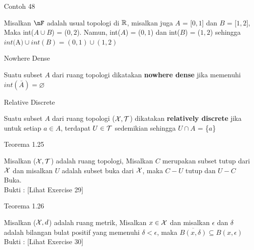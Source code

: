 \begin{frame}{Contoh 48}
    \begin{tcolorbox}[enhanced,title= Contoh 48, frame style tile={width=\paperwidth}{\wallpaper}]
        Misalkan $\nF$ adalah usual topologi di $\mathbb{R}$, misalkan juga $A$ = [$0, 1$] dan $B$ = [$1, 2$], Maka int($A \cup B$) = ($0,2$). Namun, int($A$) = ($0,1$) dan int($B$) = ($1,2$) sehingga $int($A$) \cup int(B) = (0,1) \cup (1,2)$

        
    \end{tcolorbox}
\end{frame}

\begin{frame}{Nowhere Dense}
    \begin{tcolorbox}[enhanced,title= Definisi, frame style tile={width=\paperwidth}{\wallpaper}]
        Suatu subset $A$ dari ruang topologi dikatakan \textbf{nowhere dense} jika memenuhi $int(\bar{A}) = \varnothing$
    \end{tcolorbox}
\end{frame}

\begin{frame}{Relative Discrete}
    \begin{tcolorbox}[enhanced,title= Definisi, frame style tile={width=\paperwidth}{\wallpaper}]
        Suatu subset $A$ dari ruang topologi ($\mathcal{X}, \mathcal{T}$) dikatakan \textbf{relatively discrete} jika untuk setiap $a \in A$, terdapat $U \in \mathcal{T}$ sedemikian sehingga $U \cap A$ = \{$a$\}
    \end{tcolorbox}
\end{frame}

\begin{frame}{Teorema 1.25}
    \begin{tcolorbox}[enhanced,title= Teorema 1.25, frame style tile={width=\paperwidth}{\wallpaper}]
        Misalkan ($\mathcal{X}, \mathcal{T}$) adalah ruang topologi, Misalkan $C$ merupakan subset tutup dari $\mathcal{X}$ dan misalkan $U$ adalah subset buka dari $\mathcal{X}$, maka $C - U$ tutup dan $U - C$ Buka. \\
        Bukti : [Lihat Exercise 29]
    \end{tcolorbox}
\end{frame}

\begin{frame}{Teorema 1.26}
    \begin{tcolorbox}[enhanced,title= Teorema 1.26, frame style tile={width=\paperwidth}{\wallpaper}]
        Misalkan ($\mathcal{X}, d$) adalah ruang metrik, Misalkan $x \in \mathcal{X}$ dan misalkan $\epsilon$ dan $\delta$ adalah bilangan bulat positif yang memenuhi $\delta < \epsilon$, maka $\overline{B(x,\delta)} \subseteq B(x,\epsilon)$  \\
        Bukti : [Lihat Exercise 30]
    \end{tcolorbox}
\end{frame}

